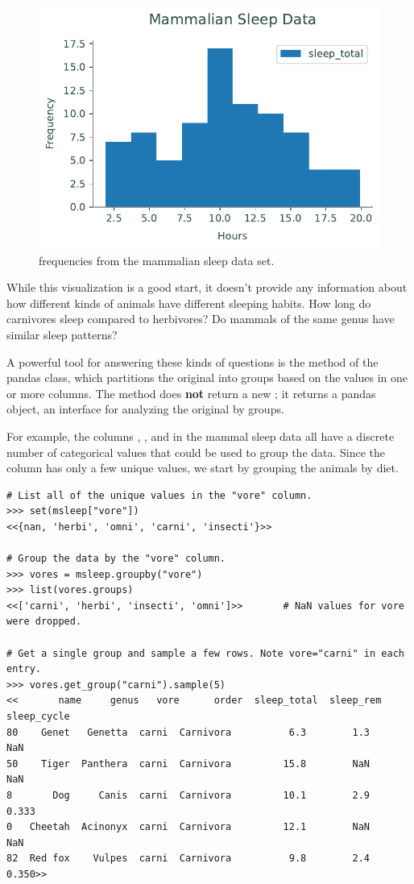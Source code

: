 \begin{figure}[H] %
    \centering
    \includegraphics[width=.7\textwidth]{figures/mammal_hist.pdf}
    \caption{ frequencies from the mammalian sleep data set.}
    \label{fig:pandas-mammals-sleep-all}
\end{figure}

While this visualization is a good start, it doesn't provide any information about how different kinds of animals have different sleeping habits.
How long do carnivores sleep compared to herbivores?
Do mammals of the same genus have similar sleep patterns?

A powerful tool for answering these kinds of questions is the  method of the pandas  class, which partitions the original  into groups based on the values in one or more columns.
The  method does \textbf{not} return a new ; it returns a pandas  object, an interface for analyzing the original  by groups.

For example, the columns , , and  in the mammal sleep data all have a discrete number of categorical values that could be used to group the data.
Since the  column has only a few unique values, we start by grouping the animals by diet.

\begin{lstlisting}
# List all of the unique values in the "vore" column.
>>> set(msleep["vore"])
<<{nan, 'herbi', 'omni', 'carni', 'insecti'}>>

# Group the data by the "vore" column.
>>> vores = msleep.groupby("vore")
>>> list(vores.groups)
<<['carni', 'herbi', 'insecti', 'omni']>>       # NaN values for vore were dropped.

# Get a single group and sample a few rows. Note vore="carni" in each entry.
>>> vores.get_group("carni").sample(5)
<<       name     genus   vore      order  sleep_total  sleep_rem  sleep_cycle
80    Genet   Genetta  carni  Carnivora          6.3        1.3          NaN
50    Tiger  Panthera  carni  Carnivora         15.8        NaN          NaN
8       Dog     Canis  carni  Carnivora         10.1        2.9        0.333
0   Cheetah  Acinonyx  carni  Carnivora         12.1        NaN          NaN
82  Red fox    Vulpes  carni  Carnivora          9.8        2.4        0.350>>
\end{lstlisting}

